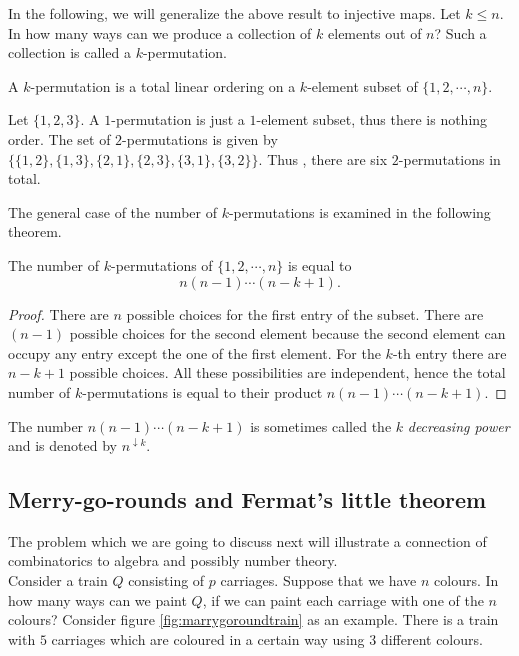 In the following, we will generalize the above result to injective maps. Let $k \leq n$. In how many ways can we produce a collection 
of $k$ elements out of $n$? Such a collection is called a $k$-permutation.

\begin{defn}[$k$-permutation]
A $k$-permutation is a total linear ordering on a $k$-element subset of $\{1, 2, \cdots, n\}$.
\end{defn}

\begin{exmp}
Let $\{1,2 ,3\}$. A $1$-permutation is just a $1$-element subset, thus there is nothing order. The set of 
$2$-permutations is given by $\{\{1,2\}, \{1,3\}, \{2,1\}, \{2,3\}, \{3,1\}, \{3,2\}\}$.
Thus , there are six $2$-permutations in total.
\end{exmp}

The general case of the number of $k$-permutations is examined in the following theorem.

\begin{theorem}
The number of $k$-permutations of $\{1,2, \cdots, n\}$ is equal to $$n(n-1)\cdots (n-k+1).$$
\end{theorem}

\begin{proof}
There are $n$ possible choices for the first entry of the subset. There are $(n-1)$ possible choices for the second element because the second element can occupy any entry except the one of the first element. 
For the $k$-th entry there are $n-k+1$ possible choices. All these possibilities are independent, hence
the total number of $k$-permutations is equal to their product $n(n-1)\cdots (n-k+1)$.
\end{proof}

The number $n(n-1)\cdots (n-k+1)$ is sometimes called the $k$ \textit{decreasing power} and is denoted by $n^{\downarrow k}$.

\subsection{Merry-go-rounds and Fermat's little theorem}
The problem which we are going to discuss next will illustrate a connection of combinatorics to algebra and possibly number theory.
\\
Consider a train $Q$ consisting of $p$ carriages. Suppose that we have $n$ colours. In how many ways can we paint $Q$, if we can paint 
each carriage with one of the $n$ colours? Consider figure \ref{fig:marrygoroundtrain} as an example. There is a train with $5$ carriages which
are coloured in a certain way using $3$ different colours.

